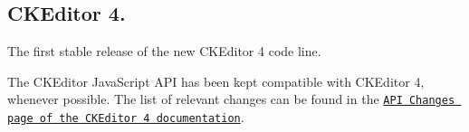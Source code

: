 \subsection*{C\-K\-Editor 4.}

The first stable release of the new C\-K\-Editor 4 code line.

The C\-K\-Editor Java\-Script A\-P\-I has been kept compatible with C\-K\-Editor 4, whenever possible. The list of relevant changes can be found in the \href{http://docs.ckeditor.com/#!/guide/dev_api_changes}{\tt A\-P\-I Changes page of the C\-K\-Editor 4 documentation}. 
